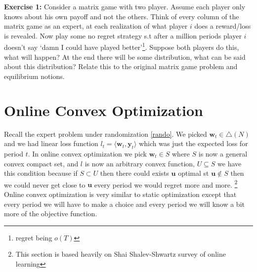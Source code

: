 \documentclass[11pt]{article}
\theoremstyle{quest}
\begin{document}
\begin{tcolorbox}
\textbf{Exercise 1:}
Consider a matrix game with two player. Assume each player only knows about his own payoff and not the others. Think of every column of the matrix game as an expert, at each realization of what player $i$ does a reward/loss is revealed. Now play some no regret strategy s.t after a million periods player $i$ doesn't say `damn I could have played better'\footnote{regret being $o(T)$}. Suppose both players do this, what will happen? At the end there will be some distribution, what can be said about this distribution? Relate this to the original matrix game problem and equilibrium notions. 
\end{tcolorbox}

\section{Online Convex Optimization}
Recall the expert problem under randomization {\color{blue} \autoref{rando}}. We picked $\mathbf{w}_t\in \triangle(N)$ and we had linear loss function $l_t = \langle \mathbf{w}_t, \mathbf{y}_t \rangle$ which was just the expected loss for period $t$. In online convex optimization we pick $\mathbf{w}_t\in S$ where $S$ is now a general convex compact set, and $l$ is now an arbitrary convex function, $U\subseteq S$  we have this condition because if  $S\subset U$ then there could exists $\mathbf{u}$ optimal st $\mathbf{u}\notin S$ then we could never get close to $\mathbf{u}$ every period we would regret more and more. \footnote{This section is based heavily on Shai Shalev-Shwartz survey of online learning} Online convex optimization is very similar to static optimization except that every period we will have to make a choice and every period we will know a bit more of the objective function. 
\end{document}

